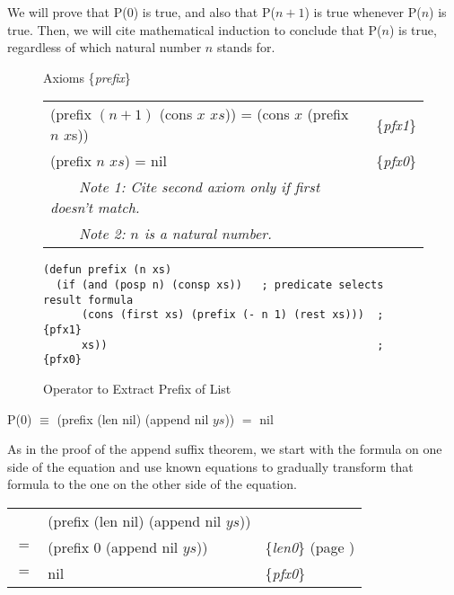 We will prove that P(0) is true, and also that P($n+1$) is true whenever P($n$) is true. Then, we will cite mathematical induction to conclude that P($n$) is true, regardless of which natural number $n$ stands for.

\begin{figure}
\begin{center}
Axioms \{\emph{prefix}\}                                           \\
\begin{tabular}{ll}
(prefix $(n + 1)$ (cons $x$ $xs$)) = (cons $x$ (prefix $n$ $x$s)) & \{\emph{pfx1}\} \\
(prefix $n$ $xs$) =  nil                                          & \{\emph{pfx0}\} \\
~~~~\emph{Note 1: Cite second axiom only if first doesn't match.}&\\
~~~~\emph{Note 2: $n$ is a natural number.}
\end{tabular}
\begin{Verbatim}
(defun prefix (n xs)
  (if (and (posp n) (consp xs))   ; predicate selects result formula
      (cons (first xs) (prefix (- n 1) (rest xs)))  ; {pfx1}
      xs))                                          ; {pfx0}
\end{Verbatim}
\end{center}
\caption{Operator to Extract Prefix of List}
\label{prefix-equations}
\end{figure}

\begin{center}
P($0$) $\equiv$ (prefix (len nil) (append nil $ys$)) $=$ nil
\end{center}

As in the proof of the append suffix theorem, we start with the formula on one side of the equation and use known equations to gradually transform that formula to the one on the other side of the equation.

\begin{center}
\begin{tabular}{lll}
    & (prefix (len nil) (append nil $ys$))  &                                                      \\
$=$ & (prefix 0 (append nil $ys$))          & \{\emph{len0}\} (page \pageref{len-equations})   \\
$=$ & nil                                   & \{\emph{pfx0}\}                                      \\
\end{tabular}
\end{center}


